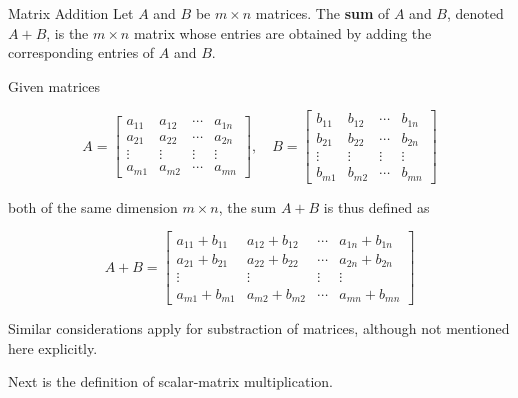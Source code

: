 \begin{definition}{Matrix Addition}
    Let $A$ and $B$ be $m \times n$ matrices. The \textbf{sum} of $A$ and $B$, denoted $A + B$, is the $m \times n$ matrix whose entries are obtained by adding the corresponding entries of $A$ and $B$.

    Given matrices

    $$
    A=\left[\begin{array}{cccc}
    a_{11} & a_{12} & \cdots & a_{1 n} \\
    a_{21} & a_{22} & \cdots & a_{2 n} \\
    \vdots & \vdots & \vdots & \vdots \\
    a_{m 1} & a_{m 2} & \cdots & a_{m n}
    \end{array}\right], \quad B=\left[\begin{array}{cccc}
    b_{11} & b_{12} & \cdots & b_{1 n} \\
    b_{21} & b_{22} & \cdots & b_{2 n} \\
    \vdots & \vdots & \vdots & \vdots \\
    b_{m 1} & b_{m 2} & \cdots & b_{m n}
    \end{array}\right]
    $$

    both of the same dimension $m \times n$, the sum $A+B$ is thus defined as

    $$
    A+B=\left[\begin{array}{cccc}
    a_{11}+b_{11} & a_{12}+b_{12} & \cdots & a_{1 n}+b_{1 n} \\
    a_{21}+b_{21} & a_{22}+b_{22} & \cdots & a_{2 n}+b_{2 n} \\
    \vdots & \vdots & \vdots & \vdots \\
    a_{m 1}+b_{m 1} & a_{m 2}+b_{m 2} & \cdots & a_{m n}+b_{m n}
    \end{array}\right]
    $$
\end{definition}

\begin{remark}
    Similar considerations apply for substraction of matrices, although not mentioned here explicitly.
\end{remark}

Next is the definition of scalar-matrix multiplication. \newpage

